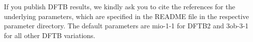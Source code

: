 \documentclass[]{tufte-book}
\begin{document}
If you publish DFTB results, we kindly ask you to cite the references for the underlying parameters, which are specified in the README file in the respective parameter directory. The default parameters are mio-1-1 for DFTB2 and 3ob-3-1 for all other DFTB variations.




\end{document}

